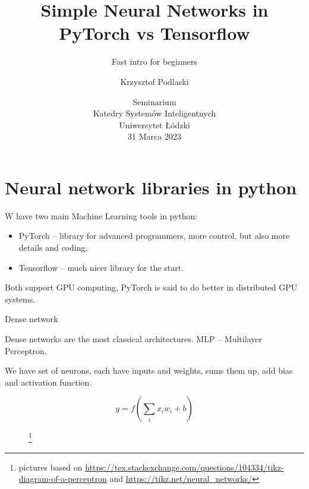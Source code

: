 \documentclass{beamer}%
\newcommand\blfootnote[1]{%
  \begingroup
  \renewcommand\thefootnote{}\footnote{#1}%
  \addtocounter{footnote}{-1}%
  \endgroup
}
\theoremstyle{definition}
\theoremstyle{definition}
\theoremstyle{example}
\theoremstyle{example}
\begin{document}
\title{Simple Neural Networks in  PyTorch vs Tensorflow}
\subtitle{Fast intro for beginners}


\author{Krzysztof Podlaski}

\date{\tiny Seminarium\\
Katedry Systemów Inteligentnych\\
Uniwersytet Łódzki\\
31 Marca 2023}

\begin{frame}
\titlepage
\end{frame}


\section{Neural network libraries in python}
\begin{frame}
W have two main Machine Learning tools in python:
\begin{itemize}
\item PyTorch -- library for advanced programmers, more control, but also more details and coding.
\item Tensorflow -- much nicer library for the start.
\end{itemize}

Both support GPU computing, PyTorch is said to do better in distributed GPU systems.
\end{frame}
\begin{frame}[fragile]{Dense network}

Dense networks are the most classical architectures. MLP -- Multilayer Perceptron.

We have set of neurons, each have inputs and weights, sums them up, add bias and activation function.

\begin{equation*}
  y = f(\sum_i x_iw_i+b)
\end{equation*}

\begin{figure}
\begin{subfigure}[b]{0.3\textwidth}
\centering
\resizebox{\textwidth}{!}{

}
\end{subfigure}
\hfill
\begin{subfigure}[b]{0.6\textwidth}
\resizebox{\textwidth}{!}{

}
\end{subfigure}\blfootnote{\tiny pictures based on \url{https://tex.stackexchange.com/questions/104334/tikz-diagram-of-a-perceptron} and \url{https://tikz.net/neural_networks/}}
\end{figure}

\end{frame}
\end{document}
